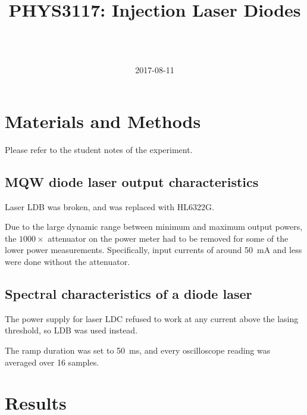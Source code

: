 \documentclass[a4paper]{scrartcl}
\begin{document}
\title{PHYS3117: Injection Laser Diodes}
\author{ \\ \\ }
\date{2017-08-11}
\maketitle

\section{Materials and Methods}
Please refer to the student notes of the experiment.

\subsection{MQW diode laser output characteristics}
Laser LDB was broken, and was replaced with HL6322G.

Due to the large dynamic range between minimum and maximum output powers, the \(1000 \times\) attenuator on the power meter had to be removed for some of the lower power measurements. Specifically, input currents of around \SI{50}{\milli\ampere} and less were done without the attenuator.

\subsection{Spectral characteristics of a diode laser}
The power supply for laser LDC refused to work at any current above the lasing threshold, so LDB was used instead.

The ramp duration was set to \SI{50}{\milli\second}, and every oscilloscope reading was averaged over 16 samples.

\section{Results}
\end{document}
